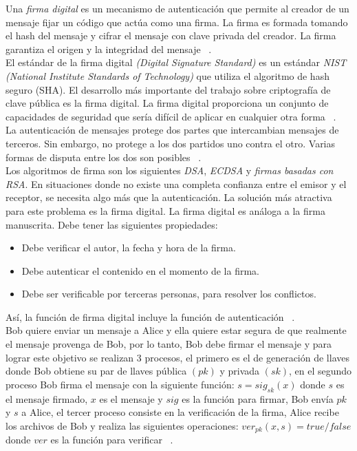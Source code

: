 Una \textit{firma digital} es un mecanismo de autenticación que permite al creador de un mensaje fijar un código que actúa como una firma. La firma es formada tomando el hash del mensaje y cifrar el mensaje con clave privada del creador. La firma garantiza el origen y la integridad del mensaje ~\cite{modes}. \\
El estándar de la firma digital \textit{(Digital Signature Standard)} es un estándar \textit{NIST (National Institute Standards of Technology) }que utiliza el algoritmo de hash seguro (SHA). El desarrollo más importante del trabajo sobre criptografía de clave pública es la firma digital. La firma digital proporciona un conjunto de capacidades de seguridad que sería difícil de aplicar en cualquier otra forma ~\cite{modes}. \\
La autenticación de mensajes protege dos partes que intercambian mensajes de terceros. Sin embargo, no protege a los dos partidos uno contra el otro. Varias formas de disputa entre los dos son posibles ~\cite{modes}. \\
Los algoritmos de firma son los siguientes \textit{DSA}, \textit{ECDSA} y \textit{firmas basadas con RSA}.
En situaciones donde no existe una completa confianza entre el emisor y el receptor, se necesita algo más que la autenticación. La solución más atractiva para este problema es la firma digital. La firma digital es análoga a la firma manuscrita. Debe tener las siguientes propiedades:

\begin{itemize}
\item Debe verificar el autor, la fecha y hora de la firma.
\item Debe autenticar el contenido en el momento de la firma.
\item Debe ser verificable por terceras personas, para resolver los conflictos.
\end{itemize}

Así, la función de firma digital incluye la función de autenticación ~\cite{modes}.\\

Bob quiere enviar un mensaje a Alice y ella quiere estar segura de que realmente el mensaje provenga de Bob, por lo tanto, Bob debe firmar el mensaje y para lograr este objetivo se realizan 3 procesos, el primero es el de generación de llaves donde Bob obtiene su par de llaves pública $(pk)$ y privada $(sk)$, en el segundo proceso Bob firma el mensaje con la siguiente función: $ s = sig_{sk} (x) $ donde $s$ es el mensaje firmado, $x$ es el mensaje y $sig$ es la función para firmar, Bob envía $pk$ y $s$ a Alice, el tercer proceso consiste en la verificación de la firma, Alice recibe los archivos de Bob y realiza las siguientes operaciones: $ ver_{pk} (x,s) = true/false $ donde $ver$ es la función para verificar ~\cite{paar}.\\


